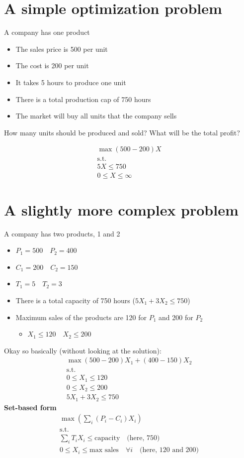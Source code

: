 \documentclass[10pt]{article}
\begin{document}
\section{A simple optimization problem}
A company has one product
\begin{itemize}
    \item The sales price is 500 per unit 
    \item The cost is 200 per unit 
    \item It takes 5 hours to produce one unit
    \item There is a total production cap of 750 hours 
    \item The market will buy all units that the company sells 
\end{itemize}
How many units should be produced and sold? What will be the total profit?

\begin{gather*}
    \max(500 - 200)X\\
    \text{s.t.}\\
    5X \le 750\\
    0\le X \le\infty
\end{gather*}
\section{A slightly more complex problem}
A company has two products, 1 and 2
\begin{itemize}
    \item $P_1 = 500\quad P_2 = 400 $
    \item $C_1 = 200\quad C_2 = 150 $
    \item $T_1 = 5\quad T_2 = 3 $
    \item There is a total capacity of 750 hours ($5X_1 + 3X_2 \le 750 $)
    \item Maximum sales of the products are 120 for $P_1 $ and 200 for $P_2 $ 
    \begin{itemize}
        \item $X_1 \le 120\quad X_2 \le 200 $
    \end{itemize}
\end{itemize}
Okay so basically (without looking at the solution):
\begin{gather*}
    \max(500 - 200)X_1 + (400 - 150)X_2\\
    \text{s.t.}\\
    0 \le X_1 \le 120\\
    0 \le X_2 \le 200\\ 
    5X_1 + 3X_2 \le 750
\end{gather*}
\textbf{Set-based form}
\begin{gather*}
    \max\left(\sum_{i}(P_i - C_i)X_i\right)\\
    \text{s.t.}\\
    \sum_{i}T_iX_i\le \text{capacity}\quad\text{(here, 750)}\\
    0\le X_i \le \text{max sales}\quad\forall i \quad\text{(here, 120 and 200)}
\end{gather*}
\newpage 
\end{document}
